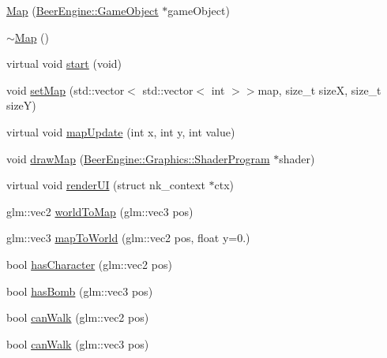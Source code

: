 \begin{DoxyCompactItemize}
\item 
\mbox{\hyperlink{class_game_1_1_component_1_1_map_acf6edbdd27dc4bc20c47718bcdf9cb3d}{Map}} (\mbox{\hyperlink{class_beer_engine_1_1_game_object}{Beer\+Engine\+::\+Game\+Object}} $\ast$game\+Object)
\item 
\mbox{\hyperlink{class_game_1_1_component_1_1_map_a275fd057bb57bdfc5c35651d8cc3a464}{$\sim$\+Map}} ()
\item 
virtual void \mbox{\hyperlink{class_game_1_1_component_1_1_map_a76e2153b5f69646ba7cf77b6cd0f5096}{start}} (void)
\item 
void \mbox{\hyperlink{class_game_1_1_component_1_1_map_aaa3da00869732537ac17430774fd8357}{set\+Map}} (std\+::vector$<$ std\+::vector$<$ int $>$$>$map, size\+\_\+t sizeX, size\+\_\+t sizeY)
\item 
virtual void \mbox{\hyperlink{class_game_1_1_component_1_1_map_ae1900809e3369230a8dd3678a397ba98}{map\+Update}} (int x, int y, int value)
\item 
void \mbox{\hyperlink{class_game_1_1_component_1_1_map_ace1c03291889d1240e2c531496878c9f}{draw\+Map}} (\mbox{\hyperlink{class_beer_engine_1_1_graphics_1_1_shader_program}{Beer\+Engine\+::\+Graphics\+::\+Shader\+Program}} $\ast$shader)
\item 
virtual void \mbox{\hyperlink{class_game_1_1_component_1_1_map_af062dd2c3e677c1d3d9204cac8508dde}{render\+UI}} (struct nk\+\_\+context $\ast$ctx)
\item 
glm\+::vec2 \mbox{\hyperlink{class_game_1_1_component_1_1_map_a0d11f1fd95d17f380ffdc65e7ef9dec9}{world\+To\+Map}} (glm\+::vec3 pos)
\item 
glm\+::vec3 \mbox{\hyperlink{class_game_1_1_component_1_1_map_ad138a7749f15feeba72af1707befc6ff}{map\+To\+World}} (glm\+::vec2 pos, float y=0.)
\item 
bool \mbox{\hyperlink{class_game_1_1_component_1_1_map_a9d6733cf76fdff6d66c5154f43c688ea}{has\+Character}} (glm\+::vec2 pos)
\item 
bool \mbox{\hyperlink{class_game_1_1_component_1_1_map_ad0e98473333fa6cc7d153802b7669b34}{has\+Bomb}} (glm\+::vec3 pos)
\item 
bool \mbox{\hyperlink{class_game_1_1_component_1_1_map_a58dde006ce5b554a6ac63dc59bb480e1}{can\+Walk}} (glm\+::vec2 pos)
\item 
bool \mbox{\hyperlink{class_game_1_1_component_1_1_map_a7a6621502aa66db7afdb6c63494c6790}{can\+Walk}} (glm\+::vec3 pos)
\item 
$$
\end{DoxyCompactItemize}
